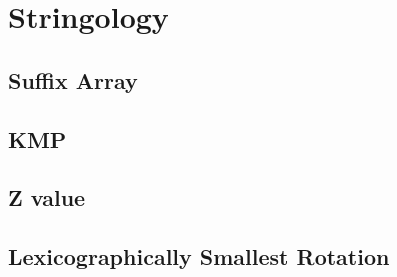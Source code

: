 \documentclass[a4paper,10pt,twocolumn,oneside]{article}
\begin{document}
%

\section{Stringology}
\subsection{Suffix Array}


%

%

\subsection{KMP}


\subsection{Z value}


%

%

\subsection{Lexicographically Smallest Rotation}

\end{document}
